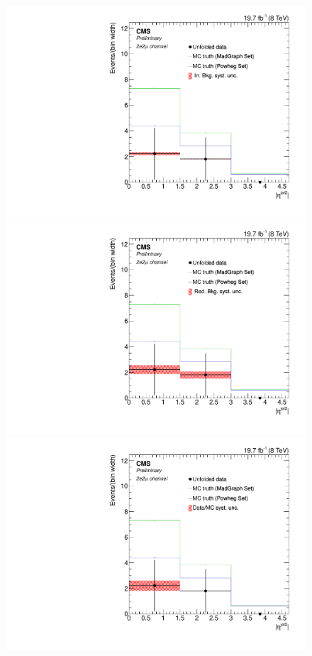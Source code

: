 \begin{figure}[hbtp]
\begin{center}
   \includegraphics[width=0.8\cmsFigWidth]{Figures/Unfolding/Systematics/ZZTo2e2m_EtaJet2_IrrBkg_Mad_fr}
   \includegraphics[width=0.8\cmsFigWidth]{Figures/Unfolding/Systematics/ZZTo2e2m_EtaJet2_RedBkg_Mad_fr}     
   \includegraphics[width=0.8\cmsFigWidth]{Figures/Unfolding/Systematics/ZZTo2e2m_EtaJet2_UnfDataOverGenMC_Mad_fr}     

\end{center}
\end{figure}

